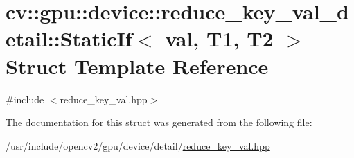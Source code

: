 \hypertarget{structcv_1_1gpu_1_1device_1_1reduce__key__val__detail_1_1StaticIf}{\section{cv\-:\-:gpu\-:\-:device\-:\-:reduce\-\_\-key\-\_\-val\-\_\-detail\-:\-:Static\-If$<$ val, T1, T2 $>$ Struct Template Reference}
\label{structcv_1_1gpu_1_1device_1_1reduce__key__val__detail_1_1StaticIf}
}


{\ttfamily \#include $<$reduce\-\_\-key\-\_\-val.\-hpp$>$}



The documentation for this struct was generated from the following file\-:\begin{DoxyCompactItemize}
\item 
/usr/include/opencv2/gpu/device/detail/\hyperlink{reduce__key__val_8hpp}{reduce\-\_\-key\-\_\-val.\-hpp}\end{DoxyCompactItemize}
